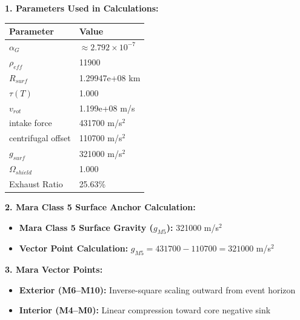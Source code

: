 \documentclass[11pt, a4paper]{article}
\begin{document}
\vspace{0.5em}
\noindent \textbf{1. Parameters Used in Calculations:}
\begin{center}
  \begin{tabular}{|l|l|}
    \hline
    \textbf{Parameter} & \textbf{Value} \\ \hline
    $\alpha_G$ & $\approx 2.792 \times 10^{-7}$ \\ \hline
    $\rho_{eff}$ & 11900 \\ \hline
    $R_{surf}$ & 1.29947e+08 km \\ \hline
    $\tau(T)$ & 1.000 \\ \hline
    $v_{rot}$ & 1.199e+08 m/s \\ \hline
    intake force & 431700 m/s$^2$ \\ \hline
    centrifugal offset & 110700 m/s$^2$ \\ \hline
    $g_{surf}$ & 321000 m/s$^2$ \\ \hline
    $\Omega_{shield}$ & 1.000 \\ \hline
    Exhaust Ratio & 25.63\% \\ \hline
  \end{tabular}
\end{center}

\vspace{0.5em}
\noindent \textbf{2. Mara Class 5 Surface Anchor Calculation:}
\begin{itemize}
  \item \textbf{Mara Class 5 Surface Gravity ($g_{M5}$):} 321000 m/s$^2$
  \item \textbf{Vector Point Calculation:} $g_{M5} = 431700 - 110700 = 321000$ m/s$^2$
\end{itemize}

\vspace{0.5em}
\noindent \textbf{3. Mara Vector Points:}
\begin{itemize}
  \item \textbf{Exterior (M6--M10):} Inverse-square scaling outward from event horizon
  \item \textbf{Interior (M4--M0):} Linear compression toward core negative sink
\end{itemize}
\end{document}

